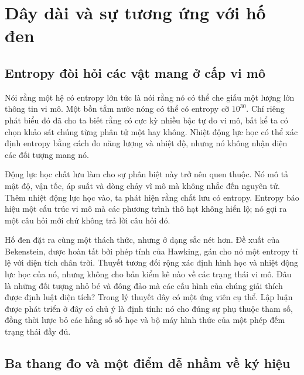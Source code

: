 \chapter{Dây dài và sự tương ứng với hố đen}


\section{Entropy đòi hỏi các vật mang ở cấp vi mô}

Nói rằng một hệ có entropy lớn tức là nói rằng nó có thể che giấu một lượng lớn thông tin vi mô. Một bồn tắm nước nóng có thể có entropy cỡ \(10^{30}\). Chỉ riêng phát biểu đó đã cho ta biết rằng có cực kỳ nhiều bậc tự do vi mô, bất kể ta có chọn khảo sát chúng từng phân tử một hay không. Nhiệt động lực học có thể xác định entropy bằng cách đo năng lượng và nhiệt độ, nhưng nó không nhận diện các đối tượng mang nó.

Động lực học chất lưu làm cho sự phân biệt này trở nên quen thuộc. Nó mô tả mật độ, vận tốc, áp suất và dòng chảy vĩ mô mà không nhắc đến nguyên tử. Thêm nhiệt động lực học vào, ta phát hiện rằng chất lưu có entropy. Entropy báo hiệu một cấu trúc vi mô mà các phương trình thô hạt không hiển lộ; nó gợi ra một câu hỏi mới chứ không trả lời câu hỏi đó.

Hố đen đặt ra cùng một thách thức, nhưng ở dạng sắc nét hơn. Đề xuất của Bekenstein, được hoàn tất bởi phép tính của Hawking, gán cho nó một entropy tỉ lệ với diện tích chân trời. Thuyết tương đối rộng xác định hình học và nhiệt động lực học của nó, nhưng không cho bản kiểm kê nào về các trạng thái vi mô. Đâu là những đối tượng nhỏ bé và đông đảo mà các cấu hình của chúng giải thích được định luật diện tích? Trong lý thuyết dây có một ứng viên cụ thể. Lập luận được phát triển ở đây có chủ ý là định tính: nó cho đúng sự phụ thuộc tham số, đồng thời lược bỏ các hằng số số học và bộ máy hình thức của một phép đếm trạng thái đầy đủ.

\section{Ba thang đo và một điểm dễ nhầm về ký hiệu}

